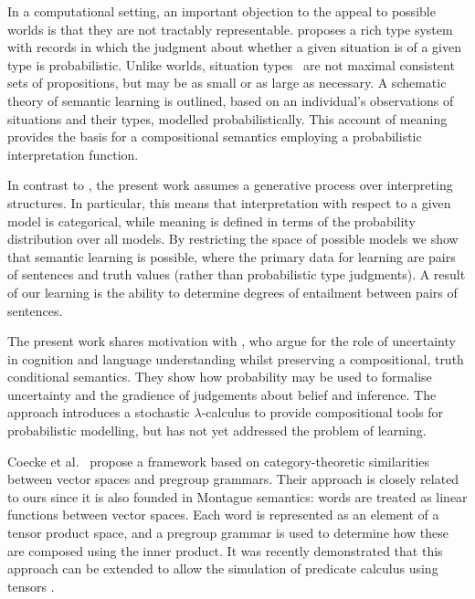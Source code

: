 \documentclass[manuscript]{clv2}
\newcommand{\newcite}[1]{\namecite{#1}}
\begin{document}
In a computational setting, an important objection to the appeal to possible worlds is that they are not tractably representable. \newcite{Cooper:14}  proposes a rich type system with records in which the judgment about whether a given situation is of a given type is probabilistic. Unlike worlds, situation types~\cite{Barwise:83} are not maximal consistent sets of propositions, but may be as small or as large as necessary. A schematic theory of semantic learning is outlined, based on an individual's observations of situations and their types, modelled probabilistically. This account of meaning provides the basis for a compositional semantics employing a probabilistic interpretation function. 

In contrast to \cite{Cooper:14}, the present work assumes a generative process over interpreting structures. In particular, this means that interpretation with respect to a given model is categorical, while meaning is defined in terms of the probability distribution over all models. By restricting the space of possible models we show that semantic learning is possible, where the primary data for learning are pairs of sentences and truth values (rather than probabilistic type judgments). A result of our learning is the ability to determine degrees of entailment between pairs of sentences.

The present work shares motivation with \newcite{Goodman:14}, who argue for the role of uncertainty in cognition and language understanding whilst preserving a compositional, truth conditional semantics. They show how probability may be used to formalise uncertainty and the gradience of judgements about belief and inference. The approach introduces a stochastic $\lambda$-calculus to provide compositional tools for probabilistic modelling,
but has not yet addressed the problem of learning.

Coecke et al.~\cite{Coecke:10} propose a framework based on category-theoretic
similarities between vector spaces and pregroup grammars. Their
approach is closely related to ours since it is also
founded in Montague semantics: words are treated as linear functions
between vector spaces. 
Each word is represented as an element of a
tensor product space, and a pregroup grammar is used to determine how
these are composed using the inner product. It was recently
demonstrated that this approach can be extended to allow the
simulation of predicate calculus using
tensors \cite{Grefenstette:13}.
\end{document}
